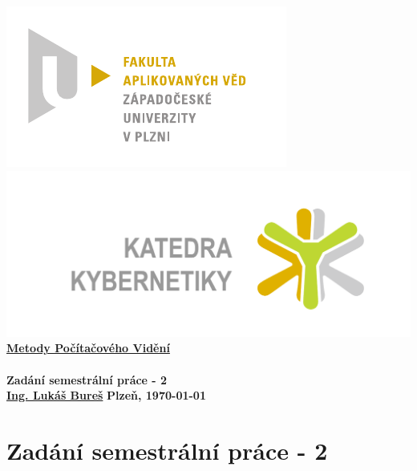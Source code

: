 \documentclass[12pt, a4paper]{article}
\newcommand{\cisloZadani}{Zadání semestrální práce - 2}
\begin{document}
 









 
\begin{titlepage}
\begin{center}
	\includegraphics[trim = 0.6cm 0.5cm 0.9cm 0.5cm, scale=1]{./FAV_logo_cz.pdf}
	\hspace*{\fill}
	\includegraphics[trim = 3.5cm 1.5cm 2.6cm 2cm, scale=0.295]{./KKY_logo_cz.pdf}\\
	\vspace*{\fill}
	\textbf{\Huge{\href{http://www.kky.zcu.cz/cs/courses/mpv}{Metody Počítačového Vidění} \\ ~ \\ \cisloZadani}}\\
	\vspace*{\fill}
	\textbf{\large{\href{mailto:LBures@kky.zcu.cz}{Ing. Lukáš Bureš}}} \hfill \textbf{\large{Plzeň, \today}}
\end{center}
\end{titlepage}








\section*{\cisloZadani}
\end{document}
